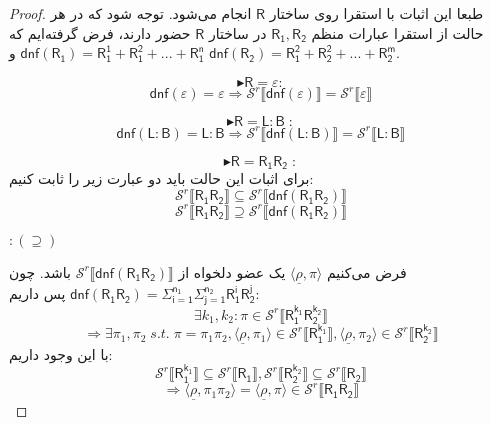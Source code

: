 \begin{proof}
	طبعا این اثبات با استقرا روی ساختار $\mathsf{R}$ انجام می‌شود.
	توجه شود که در هر حالت از استقرا عبارات منظم 
	$\mathsf{R_1 , R_2}$
	در ساختار $\mathsf{R}$ حضور دارند، فرض گرفته‌ایم که 
	$\mathsf{dnf(R_1)=R_1^1+R_1^2+...+R_1^n}$
	و
	$\mathsf{dnf(R_2)=R_1^2+R_2^2+...+R_2^m}$.
		
	$$\blacktriangleright \mathsf{R=\varepsilon:}$$
	$$\mathsf{dnf}(\varepsilon)=\varepsilon \Rightarrow 
		\mathcal{S}^r \llbracket \mathsf{dnf(\varepsilon)} \rrbracket =
		\mathcal{S}^r \llbracket \varepsilon \rrbracket$$
	
	$$\blacktriangleright \mathsf{R=L:B\;:}$$
	$$\mathsf{dnf(L:B)=L:B} \Rightarrow 
	\mathcal{S}^r \llbracket \mathsf{dnf(L:B)} \rrbracket =
	\mathcal{S}^r \llbracket \mathsf{L:B} \rrbracket$$
	
	$$\blacktriangleright \mathsf{R=R_1 R_2\;:}$$
	برای اثبات این حالت باید دو عبارت زیر را ثابت کنیم:
	$$\mathcal{S}^r \llbracket \mathsf{R_1 R_2} \rrbracket \subseteq
	  \mathcal{S}^r \llbracket \mathsf{dnf(R_1 R_2)} \rrbracket$$
	$$\mathcal{S}^r \llbracket \mathsf{R_1 R_2} \rrbracket \supseteq
	\mathcal{S}^r \llbracket \mathsf{dnf(R_1 R_2)} \rrbracket$$
	
	
	$:(\supseteq)$
	
	فرض می‌کنیم 
	$\langle \underline{\rho} , \pi \rangle$ 
	یک عضو دلخواه از 
	$\mathcal{S}^r \llbracket \mathsf{dnf(R_1 R_2)} \rrbracket$
	باشد.
	چون 
	$\mathsf{dnf(R_1R_2)=} \mathsf{\Sigma_{i=1}^{n_1} \Sigma_{j=1}^{n_2} R_1^i R_2^j }$
	 پس داریم:
	$$\exists k_1,k_2:
	\pi \in \mathcal{S}^r \llbracket \mathsf{R_1^{k_1} R_2^{k_2}} \rrbracket 
	$$
	$$\Rightarrow
	\exists \pi_1, \pi_2 \; s.t. \; \pi=\pi_1 \pi_2 , 
	\langle \underline{\rho} , \pi_1 \rangle \in \mathcal{S}^r \llbracket \mathsf{R_1^{k_1}} \rrbracket,
	\langle \underline{\rho} , \pi_2 \rangle \in \mathcal{S}^r \llbracket \mathsf{R_2^{k_2}} \rrbracket
	$$
	با این وجود داریم:
	$$\mathcal{S}^r \llbracket \mathsf{R_1^{k_1}} \rrbracket \subseteq
	\mathcal{S}^r \llbracket \mathsf{R_1} \rrbracket,
	\mathcal{S}^r \llbracket \mathsf{R_2^{k_2}} \rrbracket \subseteq
	\mathcal{S}^r \llbracket \mathsf{R_2} \rrbracket$$
	$$
	\Rightarrow
	\langle \underline{\rho} , \pi_1 \pi_2 \rangle =
	\langle \underline{\rho} , \pi \rangle \in 
	\mathcal{S}^r \llbracket \mathsf{R_1 R_2} \rrbracket$$ 
	

\end{proof}
